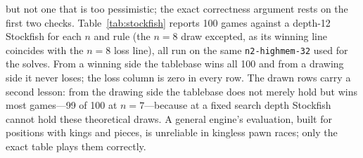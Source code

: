\documentclass[Afour,sageapa,times]{sagej}
\theoremstyle{plain}
\theoremstyle{definition}
\begin{document}
\begin{enumerate}
  but not one that is too pessimistic; the exact correctness argument rests on the
  first two checks. Table~\ref{tab:stockfish} reports 100 games against a depth-12
  Stockfish for each $n$ and rule (the $n=8$ draw excepted, as its winning line
  coincides with the $n=8$ loss line), all run on the same \texttt{n2-highmem-32}
  used for the solves. From a winning side the tablebase wins all 100 and from a
  drawing side it never loses; the loss column is zero in every row. The drawn rows
  carry a second lesson: from the drawing side the tablebase does not merely hold but
  wins most games---99 of 100 at $n=7$---because at a fixed search depth Stockfish
  cannot hold these theoretical draws. A general engine's evaluation, built for
  positions with kings and pieces, is unreliable in kingless pawn races; only the
  exact table plays them correctly.
\end{enumerate}
\end{document}
